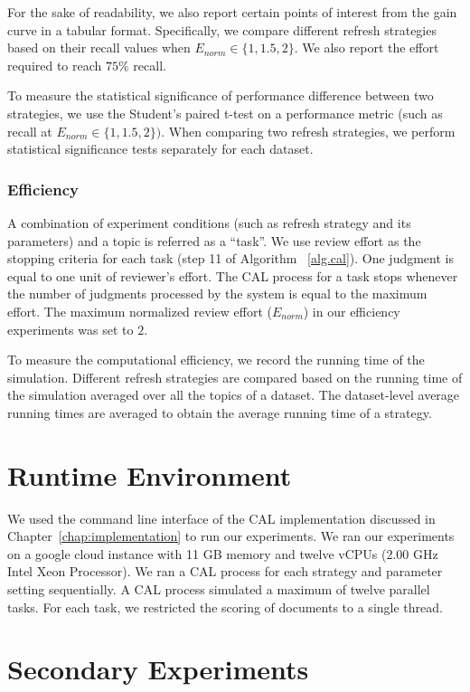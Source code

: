 For the sake of readability, we also report certain points of interest from the
gain curve in a tabular format. Specifically, we compare different refresh strategies based on
their recall values when $E_{norm} \in \{1,1.5,2\}$.  We also report the effort
required to reach $75\%$ recall.

To measure the statistical significance of performance difference between two
strategies, we use the Student's paired t-test on a performance metric (such as
recall at $E_{norm} \in \{1,1.5,2\})$. When comparing two refresh strategies, we
perform statistical significance tests separately for each dataset.

\subsubsection{Efficiency}
A combination of experiment conditions (such as refresh strategy and its
parameters) and a topic is referred as a ``task''. We use review effort as the
stopping criteria for each task (step 11 of Algorithm ~\ref{alg.cal}). One
judgment is equal to one unit of reviewer's effort. The CAL process for a task
stops whenever the number of judgments processed by the system is equal to the
maximum effort. The maximum normalized review effort ($E_{norm}$) in our
efficiency experiments was set to $2$.

To measure the computational efficiency, we record the running time of the
simulation. Different refresh strategies are compared based on the running time
of the simulation averaged over all the topics of a dataset. The dataset-level
average running times are averaged to obtain the average running time of a
strategy.


\section{Runtime Environment}

We used the command line interface of the CAL implementation discussed in
Chapter~\ref{chap:implementation} to run our experiments. We ran our experiments
on a google cloud instance with 11 GB memory and twelve vCPUs (2.00 GHz Intel Xeon
Processor). We ran a CAL process for each strategy and parameter setting
sequentially. A CAL process simulated a maximum of twelve parallel tasks. For
each task, we restricted the scoring of documents to a single thread.

\section{Secondary Experiments}
\label{sec:secondary}

